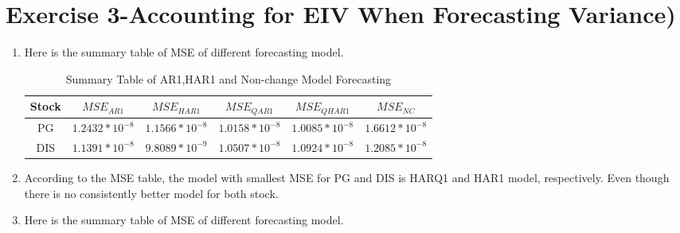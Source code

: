 \documentclass[12pt,letterpaper]{article}
\begin{document}
\section*{Exercise 3-Accounting for EIV When Forecasting Variance)}
\begin{enumerate}[label=\textbf{(\Alph*)}]
\item Here is the summary table of MSE of different forecasting model.
\vspace{-5mm}
	\begin{table}[ht]
	\footnotesize
	\caption{Summary Table of AR1,HAR1 and Non-change Model Forecasting}
	\vspace{1mm}
	\centering %
	\begin{tabular}{cccccc} %
		
		\hline %
	Stock&$MSE_{AR1}$& $MSE_{HAR1}$&$MSE_{QAR1}$& $MSE_{QHAR1}$& $MSE_{NC}$\\ \hline
	PG&$1.2432* 10^{-8}$&$1.1566* 10^{-8}$&$1.0158* 10^{-8}$&$1.0085* 10^{-8}$&$1.6612*10^{-8}$\\
	DIS&$1.1391* 10^{-8}$&$9.8089* 10^{-9}$&$1.0507* 10^{-8}$&$1.0924* 10^{-8}$&$1.2085* 10^{-8}$\\
	
		\hline %
	\end{tabular}
\end{table} 
\vspace{-5mm}
\item 
According to the MSE table, the model with smallest MSE for PG and DIS is HARQ1 and HAR1 model, respectively. Even though there is no consistently better model for both stock.

\item Here is the summary table of MSE of different forecasting model.
\vspace{-4mm}	
\begin{table}[ht]
	\caption{Forecasting MSE of Different Models $(\times10^{-8} )$}
		\vspace{1mm}
	\centering %
	\footnotesize
\end{table}
\end{enumerate}
\end{document}
